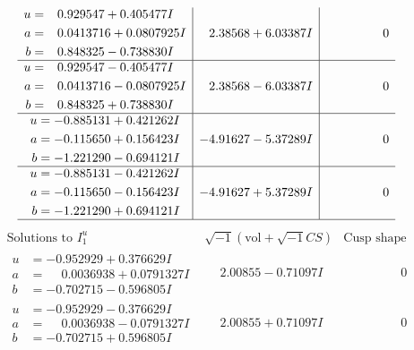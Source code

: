 \documentclass[1p]{elsarticle_modified}
\theoremstyle{definition}
\newcommand{\I}{\sqrt{-1}}
\begin{document}
$$\begin{array}{c|c|c}
\begin{aligned}
u &= \phantom{-}0.929547 + 0.405477 I \\
a &= \phantom{-}0.0413716 + 0.0807925 I \\
b &= \phantom{-}0.848325 - 0.738830 I\end{aligned}
 & \phantom{-}2.38568 + 6.03387 I & \phantom{-0.000000 } 0 \\ \hline\begin{aligned}
u &= \phantom{-}0.929547 - 0.405477 I \\
a &= \phantom{-}0.0413716 - 0.0807925 I \\
b &= \phantom{-}0.848325 + 0.738830 I\end{aligned}
 & \phantom{-}2.38568 - 6.03387 I & \phantom{-0.000000 } 0 \\ \hline\begin{aligned}
u &= -0.885131 + 0.421262 I \\
a &= -0.115650 + 0.156423 I \\
b &= -1.221290 - 0.694121 I\end{aligned}
 & -4.91627 - 5.37289 I & \phantom{-0.000000 } 0 \\ \hline\begin{aligned}
u &= -0.885131 - 0.421262 I \\
a &= -0.115650 - 0.156423 I \\
b &= -1.221290 + 0.694121 I\end{aligned}
 & -4.91627 + 5.37289 I & \phantom{-0.000000 } 0\\
 \hline 
 \end{array}$$\newpage$$\begin{array}{c|c|c}  
\text{Solutions to }I^u_{1}& \I (\text{vol} + \sqrt{-1}CS) & \text{Cusp shape}\\
 \hline 
\begin{aligned}
u &= -0.952929 + 0.376629 I \\
a &= \phantom{-}0.0036938 + 0.0791327 I \\
b &= -0.702715 - 0.596805 I\end{aligned}
 & \phantom{-}2.00855 - 0.71097 I & \phantom{-0.000000 } 0 \\ \hline\begin{aligned}
u &= -0.952929 - 0.376629 I \\
a &= \phantom{-}0.0036938 - 0.0791327 I \\
b &= -0.702715 + 0.596805 I\end{aligned}
 & \phantom{-}2.00855 + 0.71097 I & \phantom{-0.000000 } 0 \\ \hline\begin{aligned}

\end{aligned}
\end{array}$$
\end{document}
